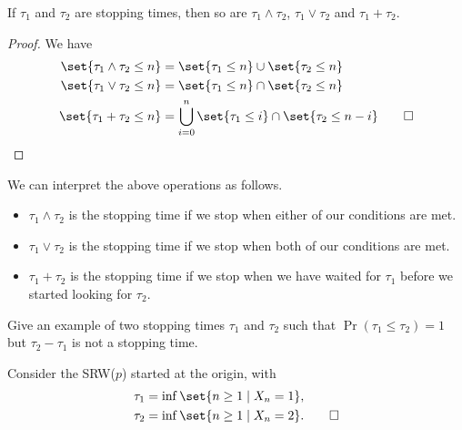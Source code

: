 \begin{proposition}
    If $\tau_1$ and $\tau_2$ are stopping times, then so are
    $\tau_1 \wedge \tau_2$, $\tau_1 \vee \tau_2$ and $\tau_1 + \tau_2$.
\end{proposition}
\begin{proof}
    We have \begin{align*}
        \set{\tau_1 \wedge \tau_2 \le n}
            &= \set{\tau_1 \le n} \cup \set{\tau_2 \le n} \\
        \set{\tau_1 \vee \tau_2 \le n}
            &= \set{\tau_1 \le n} \cap \set{\tau_2 \le n} \\
        \set{\tau_1 + \tau_2 \le n}
            &= \bigcup_{i=0}^{n} \set{\tau_1 \le i} \cap \set{\tau_2 \le n-i}
            \qedhere
    \end{align*}
\end{proof}
We can interpret the above operations as follows.
\begin{itemize}
    \item $\tau_1 \wedge \tau_2$ is the stopping time if we stop when either
    of our conditions are met.
    \item $\tau_1 \vee \tau_2$ is the stopping time if we stop when both of
    our conditions are met.
    \item $\tau_1 + \tau_2$ is the stopping time if we stop when we have
    waited for $\tau_1$ before we started looking for $\tau_2$.
\end{itemize}

\begin{exercise}
    Give an example of two stopping times $\tau_1$ and $\tau_2$ such that
    $\Pr(\tau_1 \le \tau_2) = 1$ but $\tau_2 - \tau_1$ is not a stopping
    time.
\end{exercise}
\begin{solution}
    Consider the SRW($p$) started at the origin, with \begin{align*}
        \tau_1 &= \inf\set{n \ge 1 \mid X_n = 1}, \\
        \tau_2 &= \inf\set{n \ge 1 \mid X_n = 2}. \qedhere
    \end{align*}
\end{solution}

